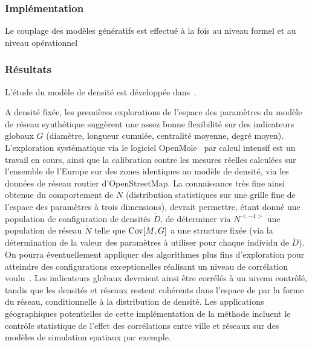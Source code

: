 \subsubsection{Implémentation}

Le couplage des modèles génératifs est effectué à la fois au niveau formel et au niveau opérationnel 



\subsubsection{Résultats}

L'étude du modèle de densité est développée dans~\cite{}.%



\begin{figure}


\end{figure}


A densité fixée, les premières explorations de l'espace des paramètres du modèle de réseau synthétique suggèrent une assez bonne flexibilité sur des indicateurs globaux $G$ (diamètre, longueur cumulée, centralité moyenne, degré moyen). L'exploration systématique via le logiciel OpenMole~\cite{reuillon2013openmole} par calcul intensif est un travail en cours, ainsi que la calibration contre les mesures réelles calculées sur l'ensemble de l'Europe sur des zones identiques au modèle de densité, via les données de réseau routier d'OpenStreetMap. La connaissance très fine ainsi obtenue du comportement de $N$ (distribution statistiques sur une grille fine de l'espace des paramètres à trois dimensions), devrait permettre, étant donné une population de configuration de densités $\tilde{D}$, de déterminer via $N^{<-1>}$ une population de réseau $\tilde{N}$ telle que $\operatorname{Cov}\!\left[M,G\right]$ a une structure fixée (via la détermination de la valeur des paramètres à utiliser pour chaque individu de $\tilde{D}$). On pourra éventuellement appliquer des algorithmes plus fins d'exploration pour atteindre des configurations exceptionelles réalisant un niveau de corrélation voulu~\cite{10.1371/journal.pone.0138212}. Les indicateurs globaux devraient ainsi être corrélés à un niveau contrôlé, tandis que les densités et réseaux restent cohérents dans l'espace de par la forme du réseau, conditionnelle à la distribution de densité. Les applications géographiques potentielles de cette implémentation de la méthode incluent le contrôle statistique de l'effet des corrélations entre ville et réseaux sur des modèles de simulation spatiaux par exemple.



